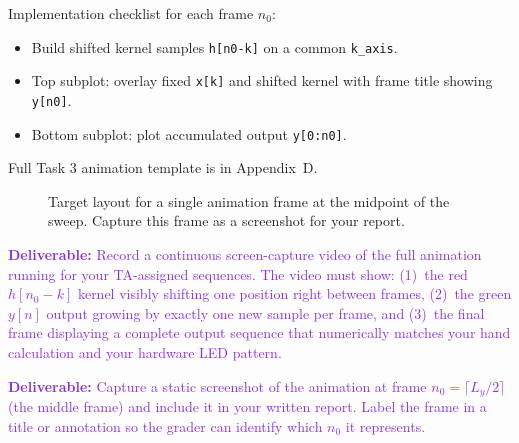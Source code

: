 \documentclass[11pt,letterpaper]{article}
\providecommand{\delECE}[1]{\textcolor{BlueViolet}{\textbf{Deliverable:} #1}}
\begin{document}
Implementation checklist for each frame $n_0$:
\begin{itemize}[nosep]
    \item Build shifted kernel samples \texttt{h[n0-k]} on a common \texttt{k\_axis}.
    \item Top subplot: overlay fixed \texttt{x[k]} and shifted kernel with frame title showing \texttt{y[n0]}.
    \item Bottom subplot: plot accumulated output \texttt{y[0:n0]}.
\end{itemize}
Full Task 3 animation template is in Appendix~D.

\begin{figure}[H]
    \centering
    \vspace{0.3in}
    \vspace{0.1in}
    \caption{Target layout for a single animation frame at the midpoint of the sweep. Capture this frame as a screenshot for your report.}
    \label{fig:matlab_animation_target}
\end{figure}

\delECE{Record a continuous screen-capture video of the full animation running for your TA-assigned sequences. The video must show: (1)~the red $h[n_0 - k]$ kernel visibly shifting one position right between frames, (2)~the green $y[n]$ output growing by exactly one new sample per frame, and (3)~the final frame displaying a complete output sequence that numerically matches your hand calculation and your hardware LED pattern.}

\delECE{Capture a static screenshot of the animation at frame $n_0 = \lceil L_y / 2 \rceil$ (the middle frame) and include it in your written report. Label the frame in a title or annotation so the grader can identify which $n_0$ it represents.}
\end{document}
